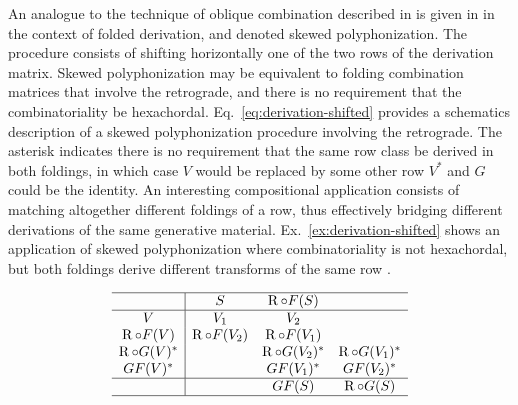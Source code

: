 An analogue to the technique of oblique combination described in \cite[241, 267]{Martino1961} is given in \cite{Starr1984} in the context of folded derivation, and denoted skewed polyphonization. The procedure consists of shifting horizontally one of the two rows of the derivation matrix. Skewed polyphonization may be equivalent to folding combination matrices that involve the retrograde, and there is no requirement that the combinatoriality be hexachordal. Eq.~\ref{eq:derivation-shifted} provides a schematics description of a skewed polyphonization procedure involving the retrograde. The asterisk indicates there is no requirement that the same row class be derived in both foldings, in which case $V$ would be replaced by some other row $V^*$ and $G$ could be the identity. An interesting compositional application consists of matching altogether different foldings of a row, thus effectively bridging different derivations of the same generative material. Ex.~\ref{ex:derivation-shifted} shows an application of skewed polyphonization where combinatoriality is not hexachordal, but both foldings derive different transforms of the same row \cite[216]{Starr1984}.

\begin{equation}
\begin{array}{c|ccc}
	\hline
    & S & \operatorname{R} \circ F(S) & \\
    \hline
    V & V_1 & V_2 & \\
    \operatorname{R} \circ F(V) & \operatorname{R} \circ F(V_2) & \operatorname{R} \circ F(V_1) & \\
    \operatorname{R} \circ G(V)^* && \operatorname{R} \circ G(V_2)^* & \operatorname{R} \circ G(V_1)^* \\
    GF(V)^* && GF(V_1)^* & GF(V_2)^* \\
    \hline
    && GF(S) & \operatorname{R} \circ G(S) \\
    \hline
\end{array}
\label{eq:derivation-shifted}
\end{equation}

\vspace{12pt}


